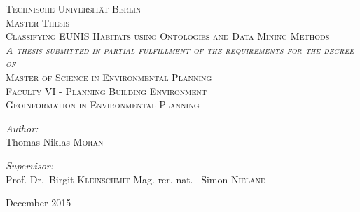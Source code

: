 \begin{titlepage}
\begin{center}

\textsc{\LARGE Technische Universit\"at Berlin}\\[0.5cm]
\textsc{Master Thesis}\\[1.5cm]

\textsc{\Large Classifying EUNIS Habitats using Ontologies and Data Mining
Methods}\\[1.5cm]
\textsc{\textit{A thesis submitted in partial fulfillment of the requirements
for the degree of}}\\[1.25cm]
\textsc{\Large Master of Science in Environmental Planning}\\[1.5cm]
\textsc{Faculty VI - Planning Building Environment\\
 Geoinformation in Environmental Planning}\\[2cm]

\noindent
\begin{minipage}{0.5\textwidth}
\begin{flushleft} \large
\emph{Author:}\\
Thomas Niklas \textsc{Moran}\\
\end{flushleft}
\end{minipage}%
\begin{minipage}{0.5\textwidth}
\begin{flushright} \large
\emph{Supervisor:} \\
Prof. Dr.~Birgit \textsc{Kleinschmit}
Mag. rer. nat. ~Simon \textsc{Nieland}
\end{flushright}
\end{minipage}

\vfill

{\large December 2015}

\end{center}
\end{titlepage}